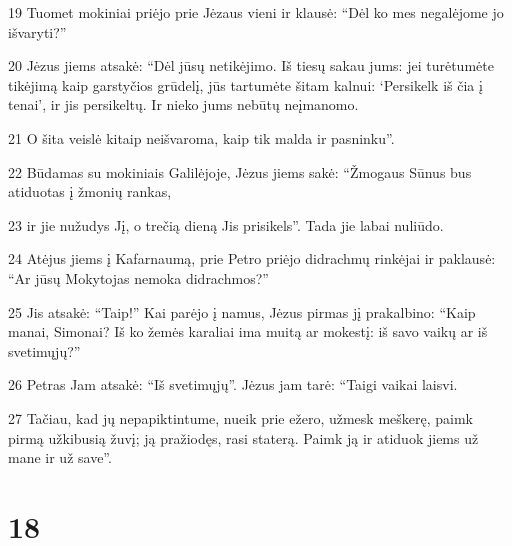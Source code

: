 \par 19 Tuomet mokiniai priėjo prie Jėzaus vieni ir klausė: “Dėl ko mes negalėjome jo išvaryti?” 
\par 20 Jėzus jiems atsakė: “Dėl jūsų netikėjimo. Iš tiesų sakau jums: jei turėtumėte tikėjimą kaip garstyčios grūdelį, jūs tartumėte šitam kalnui: ‘Persikelk iš čia į tenai’, ir jis persikeltų. Ir nieko jums nebūtų neįmanomo. 
\par 21 O šita veislė kitaip neišvaroma, kaip tik malda ir pasninku”. 
\par 22 Būdamas su mokiniais Galilėjoje, Jėzus jiems sakė: “Žmogaus Sūnus bus atiduotas į žmonių rankas, 
\par 23 ir jie nužudys Jį, o trečią dieną Jis prisikels”. Tada jie labai nuliūdo. 
\par 24 Atėjus jiems į Kafarnaumą, prie Petro priėjo didrachmų rinkėjai ir paklausė: “Ar jūsų Mokytojas nemoka didrachmos?” 
\par 25 Jis atsakė: “Taip!” Kai parėjo į namus, Jėzus pirmas jį prakalbino: “Kaip manai, Simonai? Iš ko žemės karaliai ima muitą ar mokestį: iš savo vaikų ar iš svetimųjų?” 
\par 26 Petras Jam atsakė: “Iš svetimųjų”. Jėzus jam tarė: “Taigi vaikai laisvi. 
\par 27 Tačiau, kad jų nepapiktintume, nueik prie ežero, užmesk meškerę, paimk pirmą užkibusią žuvį; ją pražiodęs, rasi staterą. Paimk ją ir atiduok jiems už mane ir už save”.



\chapter{18}


